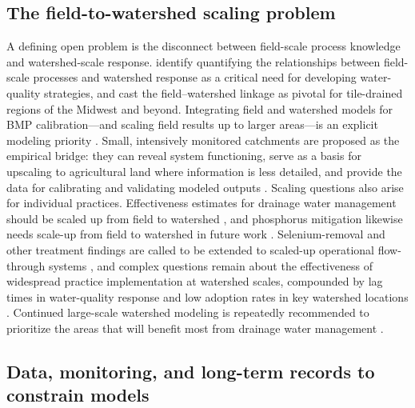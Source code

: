 \documentclass[11pt]{article}
\begin{document}
\subsection{The field-to-watershed scaling problem}

A defining open problem is the disconnect between field-scale process knowledge and watershed-scale response. \textcite{Williams2015} identify quantifying the relationships between field-scale processes and watershed response as a critical need for developing water-quality strategies, and cast the field--watershed linkage as pivotal for tile-drained regions of the Midwest and beyond. Integrating field and watershed models for BMP calibration---and scaling field results up to larger areas---is an explicit modeling priority \parencite{Wang2020b}. Small, intensively monitored catchments are proposed as the empirical bridge: they can reveal system functioning, serve as a basis for upscaling to agricultural land where information is less detailed, and provide the data for calibrating and validating modeled outputs \parencite{Kyllmar2023}. Scaling questions also arise for individual practices. Effectiveness estimates for drainage water management should be scaled up from field to watershed \parencite{Wang2021}, and phosphorus mitigation likewise needs scale-up from field to watershed in future work \parencite{Wang2021}. Selenium-removal and other treatment findings are called to be extended to scaled-up operational flow-through systems \parencite{Gao2003}, and complex questions remain about the effectiveness of widespread practice implementation at watershed scales, compounded by lag times in water-quality response and low adoption rates in key watershed locations \parencite{Roley2016}. Continued large-scale watershed modeling is repeatedly recommended to prioritize the areas that will benefit most from drainage water management \parencite{Ross2016}.

\subsection{Data, monitoring, and long-term records to constrain models}
\end{document}
